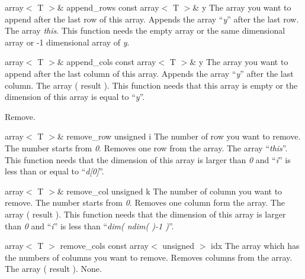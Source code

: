 \setNormalInstance
\printMethodWithOneParam
{array$<$ T $>$\&}
{append\_rows}
{const array$<$ T $>$\&}
{y}
{The array you want to append after the last row of this array.}
{Appends the array ``{\em y}'' after the last row.}
{The array {\em this}.}
{This function needs the empty array or the same dimensional array or
-1 dimensional array of {\em y}.}

\setConstInstance
\printMethodWithOneParam
{array$<$ T $>$\&}
{append\_cols}
{const array$<$ T $>$\&}
{y}
{The array you want to append after the last column of this array.}
{Appends the array ``{\em y}'' after the last column.}
{The array ( result ).}
{This function needs that this array is empty or the dimension of this
array is equal to ``{\em y}''.}

\clearpage

\noindent
Remove.

\setNormalInstance
\printMethodWithOneParam
{array$<$ T $>$\&}
{remove\_row}
{unsigned}
{i}
{The number of row you want to remove. The number starts from {\em 0}.}
{Removes one row from the array.}
{The array ``{\em this}''.}
{This function needs that the dimension of this array is larger than
{\em 0} and ``{\em i}'' is less than or equal to ``{\em d[0]}''.}

\setConstInstance
\printMethodWithOneParam
{array$<$ T $>$\&}
{remove\_col}
{unsigned}
{k}
{The number of column you want to remove. The number starts from {\em 0}.}
{Removes one column form the array.}
{The array ( result ).}
{This function needs that the dimension of this array is larger than
{\em 0}
and ``{\em i}'' is less than ``{\em dim( ndim( )-1 )}''.}

\setConstInstance
\printMethodWithOneParam
{array$<$ T $>$}
{remove\_cols}
{const array$<$ unsigned $>$}
{idx}
{The array which has the numbers of columns you want to remove.}
{Removes columns from the array.}
{The array ( result ).}
{None.}

